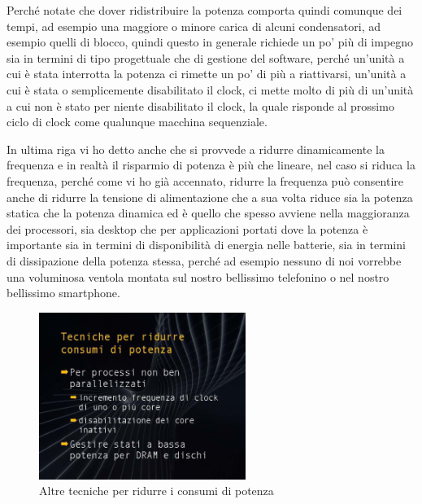 Perché notate che dover ridistribuire la potenza comporta quindi comunque dei tempi, ad esempio una maggiore o minore carica di alcuni condensatori, ad esempio quelli di blocco, quindi questo in generale richiede un po' più di impegno sia in termini di tipo progettuale che di gestione del software, perché un'unità a cui è stata interrotta la potenza ci rimette un po' di più a riattivarsi, un'unità a cui è stata o semplicemente disabilitato il clock, ci mette molto di più di un'unità a cui non è stato per niente disabilitato il clock, la quale risponde al prossimo ciclo di clock come qualunque macchina sequenziale.

In ultima riga vi ho detto anche che si provvede a ridurre dinamicamente la frequenza e in realtà il risparmio di potenza è più che lineare, nel caso si riduca la frequenza, perché come vi ho già accennato, ridurre la frequenza può consentire anche di ridurre la tensione di alimentazione che a sua volta riduce sia la potenza statica che la potenza dinamica ed è quello che spesso avviene nella maggioranza dei processori, sia desktop che per applicazioni portati dove la potenza è importante sia in termini di disponibilità di energia nelle batterie, sia in termini di dissipazione della potenza stessa, perché ad esempio nessuno di noi vorrebbe una voluminosa ventola montata sul nostro bellissimo telefonino o nel nostro bellissimo smartphone.

\FloatBarrier
\begin{figure}[H]
  \centering
  \includegraphics[width=0.6\textwidth,
                    trim=40 40 45 40, %
                    clip]{images/Lez02_p02_fig_02.png}
  \caption{Altre tecniche per ridurre i consumi di potenza}
  \label{fig:Lez02_p02_fig_02}
\end{figure}
\FloatBarrier
\noindent

